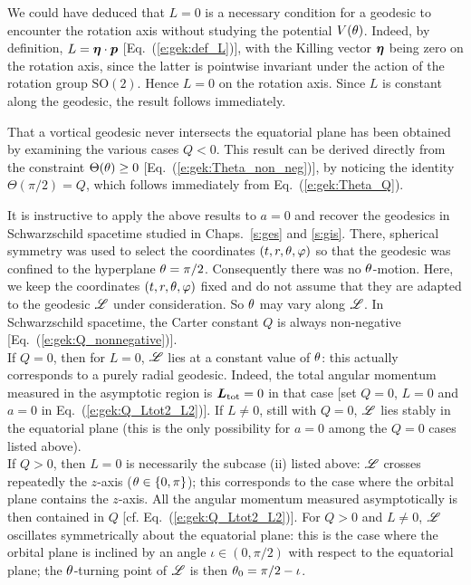 \begin{remark}
We could have deduced that $L=0$ is a necessary condition for a geodesic
to encounter the rotation axis without studying the potential $V(\theta)$. Indeed,
by definition, $L = \bm{\eta}\cdot\bm{p}$ [Eq.~(\ref{e:gek:def_L})], with the Killing
vector $\bm{\eta}$ being zero on the rotation axis, since the latter is
pointwise invariant under the action of the rotation group $\mathrm{SO}(2)$.
Hence $L=0$ on the rotation axis. Since $L$ is constant along the geodesic,
the result follows immediately.
\end{remark}

\begin{remark}
That a vortical geodesic never intersects the equatorial plane has been
obtained by examining the various cases $Q<0$. This result can be derived
directly from the constraint $\Theta(\theta)\geq 0$ [Eq.~(\ref{e:gek:Theta_non_neg})],
by noticing the identity
$\Theta(\pi/2) = Q$, which follows immediately from Eq.~(\ref{e:gek:Theta_Q}).
\end{remark}

\begin{example}
It is instructive to apply the above results to $a=0$ and recover
the geodesics in Schwarzschild spacetime studied in Chaps.~\ref{s:ges} and \ref{s:gis}.
There, spherical symmetry was used to select the coordinates $(t,r,\theta,\varphi)$ so that
the geodesic was confined to the hyperplane $\theta=\pi/2$. Consequently there was
no $\theta$-motion. Here, we keep the coordinates $(t,r,\theta,\varphi)$ fixed and do not
assume that they are adapted to the geodesic $\mathscr{L}$ under consideration. So $\theta$
may vary along $\mathscr{L}$. In Schwarzschild spacetime, the Carter constant $Q$
is always non-negative [Eq.~(\ref{e:gek:Q_nonnegative})].\\
If $Q=0$, then for $L=0$, $\mathscr{L}$ lies at a constant value of $\theta$: this actually
corresponds to a purely radial geodesic. Indeed,
the total angular momentum measured in the asymptotic region is $\bm{L}_{\rm tot} = 0$
in that case [set $Q=0$, $L=0$ and $a=0$ in Eq.~(\ref{e:gek:Q_Ltot2_L2})].
If $L\neq 0$, still with $Q=0$,
$\mathscr{L}$ lies stably in the equatorial plane (this is the only possibility for $a=0$ among
the $Q=0$ cases listed above).\\
If $Q>0$, then $L=0$ is necessarily the subcase (ii) listed above:
$\mathscr{L}$ crosses repeatedly the $z$-axis ($\theta\in\{0,\pi\}$); this corresponds to the case where
the orbital plane contains the $z$-axis. All the angular momentum measured asymptotically
is then contained in $Q$ [cf. Eq.~(\ref{e:gek:Q_Ltot2_L2})].
For $Q>0$ and $L\neq 0$, $\mathscr{L}$ oscillates symmetrically about the equatorial
plane: this is the case where the orbital plane is inclined by an angle
$\iota\in(0,\pi/2)$
with respect to the equatorial plane; the $\theta$-turning point of $\mathscr{L}$ is then
$\theta_0 = \pi/2-\iota$.
\end{example}


